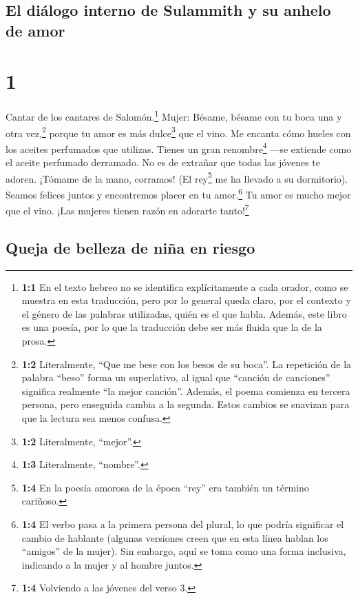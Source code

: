 \hypertarget{el-diuxe1logo-interno-de-sulammith-y-su-anhelo-de-amor}{%
\subsection{El diálogo interno de Sulammith y su anhelo de
amor}\label{el-diuxe1logo-interno-de-sulammith-y-su-anhelo-de-amor}}

\hypertarget{section}{%
\section{1}\label{section}}

 Cantar de los cantares de Salomón.\footnote{\textbf{1:1}
  En el texto hebreo no se identifica explícitamente a cada orador, como
  se muestra en esta traducción, pero por lo general queda claro, por el
  contexto y el género de las palabras utilizadas, quién es el que
  habla. Además, este libro es una poesía, por lo que la traducción debe
  ser más fluida que la de la prosa.} Mujer:  Bésame,
bésame con tu boca una y otra vez,\footnote{\textbf{1:2} Literalmente,
  ``Que me bese con los besos de su boca''. La repetición de la palabra
  ``beso'' forma un superlativo, al igual que ``canción de canciones''
  significa realmente ``la mejor canción''. Además, el poema comienza en
  tercera persona, pero enseguida cambia a la segunda. Estos cambios se
  suavizan para que la lectura sea menos confusa.} porque tu amor es más
dulce\footnote{\textbf{1:2} Literalmente, ``mejor''.} que el vino.
 Me encanta cómo hueles con los aceites perfumados que
utilizas. Tienes un gran renombre\footnote{\textbf{1:3} Literalmente,
  ``nombre''.} ---se extiende como el aceite perfumado derramado. No es
de extrañar que todas las jóvenes te adoren.  ¡Tómame de
la mano, corramos! (El rey\footnote{\textbf{1:4} En la poesía amorosa de
  la época ``rey'' era también un término cariñoso.} me ha llevado a su
dormitorio). Seamos felices juntos y encontremos placer en tu
amor.\footnote{\textbf{1:4} El verbo pasa a la primera persona del
  plural, lo que podría significar el cambio de hablante (algunas
  versiones creen que en esta línea hablan los ``amigos'' de la mujer).
  Sin embargo, aquí se toma como una forma inclusiva, indicando a la
  mujer y al hombre juntos.} Tu amor es mucho mejor que el vino. ¡Las
mujeres tienen razón en adorarte tanto!\footnote{\textbf{1:4} Volviendo
  a las jóvenes del verso 3.}

\hypertarget{queja-de-belleza-de-niuxf1a-en-riesgo}{%
\subsection{Queja de belleza de niña en
riesgo}\label{queja-de-belleza-de-niuxf1a-en-riesgo}}

